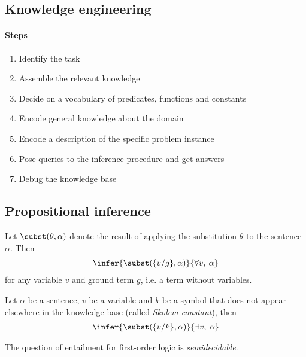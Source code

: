 \documentclass{article}
\begin{document}
\subsection{Knowledge engineering}

\paragraph{Steps}
\begin{enumerate}
    \item Identify the task 
    \item Assemble the relevant knowledge
    \item Decide on a vocabulary of predicates, functions and constants
    \item Encode general knowledge about the domain
    \item Encode a description of the specific problem instance
    \item Pose queries to the inference procedure and get answers
    \item Debug the knowledge base
\end{enumerate}

\subsection{Propositional inference}

\begin{theorem}
    Let $\subst(\theta, \alpha)$ denote the result of applying
    the substitution $\theta$ to the sentence $\alpha$. Then
    \begin{align*}
        \infer{\subst(\{v/g\},\alpha)}{\forall v,\:\alpha}
    \end{align*}
    for any variable $v$ and ground term $g$, i.e. a term without variables.
\end{theorem}

\begin{theorem}
    Let $\alpha$ be a sentence, $v$ be a variable and $k$ be a
    symbol that does not appear elsewhere in the knowledge base
    (called \emph{Skolem constant}), then 
    \begin{align*}
        \infer{\subst(\{v/k\},\alpha)}{\exists v,\:\alpha}
    \end{align*} 
\end{theorem}

\begin{theorem}
    The question of entailment for first-order logic is \emph{semidecidable}.
\end{theorem} 
\end{document}
